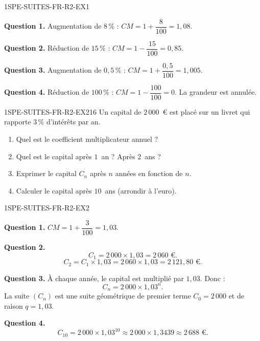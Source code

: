 \begin{corrige}{1SPE-SUITES-FR-R2-EX1}


\textbf{Question 1.} Augmentation de $8\,\%$ : $CM = 1 + \dfrac{8}{100} = 1{,}08$.


\textbf{Question 2.} Réduction de $15\,\%$ : $CM = 1 - \dfrac{15}{100} = 0{,}85$.

\textbf{Question 3.} Augmentation de $0{,}5\,\%$ : $CM = 1 + \dfrac{0{,}5}{100} = 1{,}005$.

\textbf{Question 4.} Réduction de $100\,\%$ : $CM = 1 - \dfrac{100}{100} = 0$. La grandeur est annulée.

\end{corrige}


\begin{exercice}{1SPE-SUITES-FR-R2-EX2}{1}{6}
Un capital de $2\,000$~€ est placé sur un livret qui rapporte $3\,\%$ d'intérêts par an.
\begin{enumerate}
  \item Quel est le coefficient multiplicateur annuel ?
  \item Quel est le capital après $1$~an ? Après $2$~ans ?
  \item Exprimer le capital $C_n$ après $n$ années en fonction de $n$.
  \item Calculer le capital après $10$~ans (arrondir à l'euro).
\end{enumerate}
\end{exercice}


\begin{corrige}{1SPE-SUITES-FR-R2-EX2}


\textbf{Question 1.} $CM = 1 + \dfrac{3}{100} = 1{,}03$.

\textbf{Question 2.}
\[
C_1 = 2\,000 \times 1{,}03 = 2\,060 \text{ €.}
\]
\[
C_2 = C_1 \times 1{,}03 = 2\,060 \times 1{,}03 = 2\,121{,}80 \text{ €.}
\]


\textbf{Question 3.} À chaque année, le capital est multiplié par $1{,}03$. Donc :
\[
C_n = 2\,000 \times 1{,}03^n.
\]
La suite $(C_n)$ est une suite géométrique de premier terme $C_0 = 2\,000$ et de raison $q = 1{,}03$.

\textbf{Question 4.}
\[
C_{10} = 2\,000 \times 1{,}03^{10} \approx 2\,000 \times 1{,}3439 \approx 2\,688 \text{ €.}
\]

\end{corrige}

